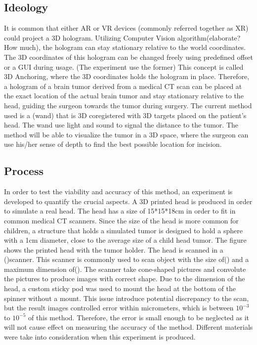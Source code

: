 \documentclass[12pt]{spieman}  %
\begin{document}
\begin{spacing}{2}
\subsection{Ideology}
It is common that either AR or VR devices (commonly referred together as XR) could project a 3D hologram. Utilizing Computer Vision algorithm(elaborate? How much), the hologram can stay stationary relative to the world coordinates. The 3D coordinates of this hologram can be changed freely using predefined offset or a GUI during usage. (The experiment use the former) This concept is called 3D Anchoring, where the 3D coordinates holds the hologram in place. Therefore, a hologram of a brain tumor derived from a medical CT scan can be placed at the exact location of the actual brain tumor and stay stationary relative to the head, guiding the surgeon towards the tumor during  surgery. 
The current method used is a (wand) that is 3D coregistered with 3D targets placed on the patient's head. The wand use light and sound to signal the distance to the tumor. The method will be able to visualize the tumor in a 3D space, where the surgeon can use his/her sense of depth to find the best possible location for incision.

\subsection{Process}
In order to test the viability and accuracy of this method, an experiment is developed to quantify the crucial aspects. A 3D printed head is produced in order to simulate a real head. The head has a size of 15*15*18cm in order to fit in common medical CT scanners. Since the size of the head is more common for children, a structure that holds a simulated tumor is designed to hold a sphere with a 1cm diameter, close to the average size of a child head tumor. The figure shows the printed head with the tumor holder. 
The head is scanned in a ()scanner. This scanner is commonly used to scan object with the size of() and a maximum dimension of(). The scanner take cone-shaped pictures and convolute the pictures to produce images with correct shape. Due to the dimension of the head, a custom sticky pod was used to mount the head at the bottom of the spinner without a mount. This issue introduce potential discrepancy to the scan, but the result images controlled error within micrometers, which is between $10^{-3}$ to $ 10^{-5}$ of this method. Therefore, the error is small enough to be neglected as it will not cause effect on measuring the accuracy of the method.
Different materials were take into consideration when this experiment is produced. 





\end{spacing}
\end{document}
